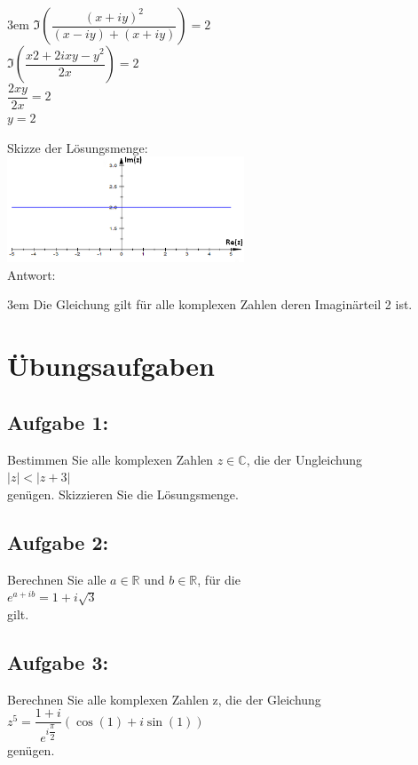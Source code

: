 \documentclass[11pt,final]{scrreprt}
\newcommand{\br} {\medskip\\}
\newcommand{\R} {\mathbb R}
\newcommand{\C} {\mathbb C}
\begin{document}
\begingroup
\leftskip3em 
$ \Im\left( \dfrac{(x+iy)^2}{(x-iy)+(x+iy)} \right) = 2 $\\
$ \Im\left( \dfrac{x2+2ixy-y^2}{2x} \right) = 2 $\\
$ \dfrac{2xy}{2x} = 2 $\\
$ y = 2$\\
\par	
\endgroup 
Skizze der Lösungsmenge:\\
\hspace*{3em}\includegraphics[width=200pt]{images/complex_numbers_01.png}\br
Antwort:

\begingroup
\leftskip3em 
Die Gleichung gilt für alle komplexen Zahlen deren Imaginärteil 2 ist.\\
\par	
\endgroup 

\newpage
\section{Übungsaufgaben}
\subsection*{Aufgabe 1:}
Bestimmen Sie alle komplexen Zahlen $ z \in\C$, die der Ungleichung\\
\hspace*{3em}$|z|<|z+3|$\\
genügen. Skizzieren Sie die Lösungsmenge.
\subsection*{Aufgabe 2:}
Berechnen Sie alle $a\in\R$ und $b\in\R$, für die\\
\hspace*{3em}$ e^{a+ib} = 1+i\sqrt{3}$\\
gilt.
\subsection*{Aufgabe 3:}
Berechnen Sie alle komplexen Zahlen z, die der Gleichung\\
\hspace*{3em}$ z^5 = \dfrac{1+i}{e^{i\dfrac{\pi}{2}}}(\cos(1)+i\sin(1))$\\
genügen.
\end{document}
